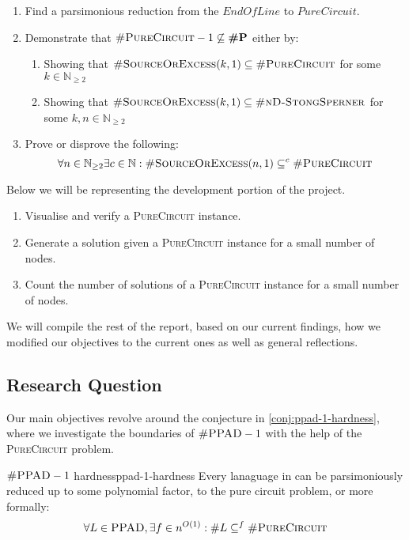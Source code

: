 \begin{enumerate}[label*=R.\arabic*)]
    \item Find a parsimonious reduction from the $\textit{EndOfLine}$ to $\textit{PureCircuit}$.
    \item Demonstrate that $\textsc{\#PureCircuit}- 1 \not\subseteq \textbf{\#P}$ either by:
        \begin{enumerate}
            \item Showing that $\textsc{\#SourceOrExcess}(k, 1) \subseteq \textsc{\#PureCircuit}$ for some $k \in \mathbb{N}_{\geq 2}$
            \item Showing that $\textsc{\#SourceOrExcess}(k, 1) \subseteq \textsc{\#nD-StongSperner}$ for some $k,n \in \mathbb{N}_{\geq 2}$ 
        \end{enumerate}
    \item Prove or disprove the following:
\[
\forall n \in \mathbb{N}_{\geq 2} \exists c \in \mathbb{N}:  \textnormal{\textsc{\#SourceOrExcess}}(n, 1) \subseteq^c \textnormal{\textsc{\#PureCircuit}}
\]

\end{enumerate}

Below we will be representing the development portion of the project.

\begin{enumerate}[label=S.\arabic*)]
    \item Visualise and verify a \textsc{PureCircuit} instance.
    \item Generate a solution given a \textsc{PureCircuit} instance for a small number of nodes.
    \item Count the number of solutions of a  \textsc{PureCircuit} instance for a small number of nodes.
\end{enumerate}


We will compile the rest of the report, based on our current findings, how we modified our objectives to
the current ones as well as general reflections.


\subsection{Research Question}

Our main objectives revolve around the conjecture in \ref{conj:ppad-1-hardness}, where
we investigate the boundaries of $\textnormal{\textsc{\#PPAD}}-1$ with the help of the \textsc{PureCircuit} problem.
\begin{conjecturebox}{$\textnormal{\textsc{\#PPAD}}-1$ hardness}{ppad-1-hardness}
    Every lanaguage in  can be parsimoniously reduced up to some polynomial factor, to the
    pure circuit problem,  or more formally:
    $$
    \forall L \in \textnormal{\textsc{PPAD}}, \exists f \in n^{O(1)}: 
    \#L \subseteq^f \textnormal{\textsc{\#PureCircuit}}
    $$
\end{conjecturebox}

